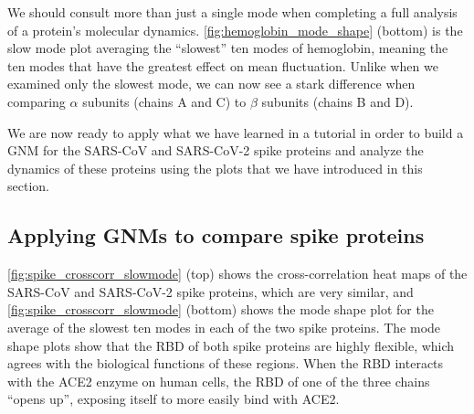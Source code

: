 We should consult more than just a single mode when completing a full analysis of a protein's molecular dynamics. \autoref{fig:hemoglobin_mode_shape} (bottom) is the slow mode plot averaging the ``slowest'' ten modes of hemoglobin, meaning the ten modes that have the greatest effect on mean fluctuation. Unlike when we examined only the slowest mode, we can now see a stark difference when comparing $\alpha$ subunits (chains A and C) to $\beta$ subunits (chains B and D).

We are now ready to apply what we have learned in a tutorial in order to build a GNM for the SARS-CoV and SARS-CoV-2 spike proteins and analyze the dynamics of these proteins using the plots that we have introduced in this section.

\FloatBarrier
{}
\subsection{Applying GNMs to compare spike proteins}

\autoref{fig:spike_crosscorr_slowmode} (top) shows the cross-correlation heat maps of the SARS-CoV and SARS-CoV-2 spike proteins, which are very similar, and \autoref{fig:spike_crosscorr_slowmode} (bottom) shows the mode shape plot for the average of the slowest ten modes in each of the two spike proteins. The mode shape plots show that the RBD of both spike proteins are highly flexible, which agrees with the biological functions of these regions. When the RBD interacts with the ACE2 enzyme on human cells, the RBD of one of the three chains ``opens up'', exposing itself to more easily bind with ACE2.\\

